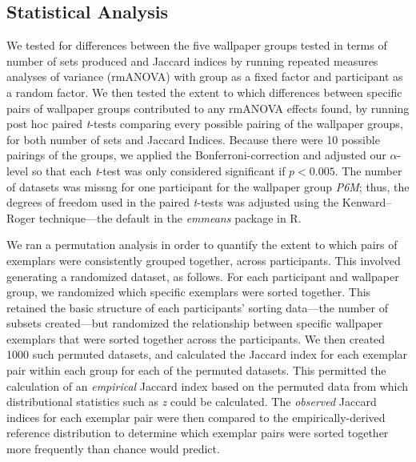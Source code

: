 \documentclass[symmetry,article,accept,pdftex,moreauthors]{Definitions/mdpi}
\begin{document}
\subsection{Statistical Analysis}
We tested for differences between the five wallpaper groups tested in terms of number of sets produced and Jaccard indices by running repeated measures analyses of variance (rmANOVA) with group as a fixed factor and participant as a random factor. We then tested the extent to which differences between specific pairs of wallpaper groups contributed to any rmANOVA effects found, by running post hoc paired \textit{t}-tests comparing every possible pairing of the wallpaper groups, for both number of sets and Jaccard Indices. Because there were 10 possible pairings of the groups, we applied the Bonferroni-correction and adjusted our $\alpha$-level so that each \textit{t}-test was only considered significant if $p < 0.005$. The number of datasets was missng for one participant for the wallpaper group \textit{P6M}; thus, the degrees of freedom used in the paired \textit{t}-tests was adjusted using the Kenward--Roger technique---the default in the \textit{emmeans} package in R.

We ran a permutation analysis in order to quantify the extent to which pairs of exemplars were consistently grouped together, across participants. This involved generating a randomized dataset, as follows. For each participant and wallpaper group, we randomized which specific exemplars were sorted together. This retained the basic structure of each participants' sorting data---the number of subsets created---but randomized the relationship between specific wallpaper exemplars that were sorted together across the participants. We then created 1000 such permuted datasets, and calculated the Jaccard index for each exemplar pair within each group for each of the permuted datasets. This permitted the calculation of an \emph{empirical} Jaccard index based on the permuted data from which distributional statistics such as \textit{z} could be calculated. The \emph{observed} Jaccard indices for each exemplar pair were then compared to the empirically-derived reference distribution to determine which exemplar pairs were sorted together more frequently than chance would predict.



\vspace{6pt} 

\end{document}
